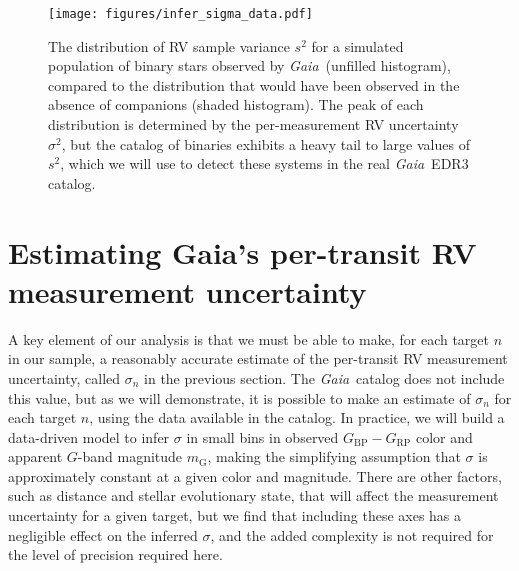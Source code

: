 \documentclass[modern, letterpaper]{aastex631}
\newcommand{\project}[1]{\textsl{#1}}
\newcommand{\Gaia}{\project{Gaia}}
\begin{document}
\begin{figure}
	\begin{centering}
		\texttt{[image: figures/infer\_sigma\_data.pdf]}
		\caption{The distribution of RV sample variance ${s}^2$ for a simulated population of binary stars observed by \Gaia\ (unfilled histogram), compared to the distribution that would have been observed in the absence of companions (shaded histogram).
			The peak of each distribution is determined by the per-measurement RV uncertainty $\sigma^2$, but the catalog of binaries exhibits a heavy tail to large values of $s^2$, which we will use to detect these systems in the real \Gaia\ EDR3 catalog.}
		\label{fig:infer_sigma:data}
	\end{centering}
\end{figure}

\section{Estimating Gaia's per-transit RV measurement uncertainty}\label{sec:noise}

A key element of our analysis is that we must be able to make, for each target $n$ in our sample, a reasonably accurate estimate of the per-transit RV measurement uncertainty, called $\sigma_n$ in the previous section.
The \Gaia\ catalog does not include this value, but as we will demonstrate, it is possible to make an estimate of $\sigma_n$ for each target $n$, using the data available in the catalog.
In practice, we will build a data-driven model to infer $\sigma$ in small bins in observed $G_\mathrm{BP} - G_\mathrm{RP}$ color and apparent $G$-band magnitude $m_\mathrm{G}$, making the simplifying assumption that $\sigma$ is approximately constant at a given color and magnitude.
There are other factors, such as distance and stellar evolutionary state, that will affect the measurement uncertainty for a given target, but we find that including these axes has a negligible effect on the inferred $\sigma$, and the added complexity is not required for the level of precision required here.
\end{document}

